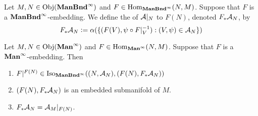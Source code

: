 \documentclass{book}
\begin{document}
	\begin{defn} 
		Let $M, N \in \Obj(\ManBndinf)$ and $F \in \Hom_{\ManBndinf}(N, M)$. Suppose that $F$ is a  $\ManBndinf$-embedding. We define the  of $\MA|_N$ to $F(N)$, denoted $F_*\MA_N$, by 
		$$F_*\MA_N \defeq \al (\{(F(V), \psi \circ F|_V^{-1}): (V, \psi) \in \MA_N\})$$
	\end{defn}

	\begin{ex} 
		Let $M, N \in \Obj(\Maninf)$ and  $F \in \Hom_{\Maninf}(N, M)$. Suppose that $F$ is a  $\Maninf$-embedding. Then
		\begin{enumerate}
			\item $F|^{F(N)} \in \Iso_{\ManBndinf}((N, \MA_N), (F(N), F_*\MA_N))$
			\item $(F(N), F_*\MA_N)$ is an embedded submanifold of $M$. 
			\item $F_*\MA_N = \MA_M|_{F(N)}$.
		\end{enumerate}
	\end{ex}
	
\end{document}

